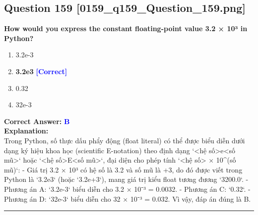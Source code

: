 \documentclass[11pt,a4paper]{article}
\begin{document}
\begin{minipage}{\textwidth}
\subsection*{Question 159 \quad \footnotesize{[0159_q159_Question_159.png]}}
\noindent \textbf{How would you express the constant floating-point value 3.2 × 10³ in Python?}

\begin{enumerate}[label=\Alph*.]
    \item 3.2e-3
    \item \textbf{3.2e3} \hfill \textcolor{blue}{\textbf{[Correct]}}
    \item 0.32
    \item 32e-3
\end{enumerate}

\noindent \textbf{Correct Answer:} \textcolor{blue}{\textbf{B}} \\[4pt]
\noindent \textbf{Explanation:}\\
Trong Python, số thực dấu phẩy động (float literal) có thể được biểu diễn dưới dạng ký hiệu khoa học (scientific E-notation) theo định dạng `<hệ số>e<số mũ>` hoặc `<hệ số>E<số mũ>`, đại diện cho phép tính `<hệ số> × 10^(số mũ)`:\newline
- Giá trị 3.2 × 10³ có hệ số là 3.2 và số mũ là +3, do đó được viết trong Python là `3.2e3` (hoặc `3.2e+3`), mang giá trị kiểu float tương đương `3200.0`.\newline
- Phương án A: `3.2e-3` biểu diễn cho 3.2 × 10⁻³ = 0.0032.\newline
- Phương án C: `0.32`.\newline
- Phương án D: `32e-3` biểu diễn cho 32 × 10⁻³ = 0.032.\newline
Vì vậy, đáp án đúng là B.
\end{minipage}
\vspace{0.8cm}
\hrule
\vspace{0.5cm}
\end{document}
